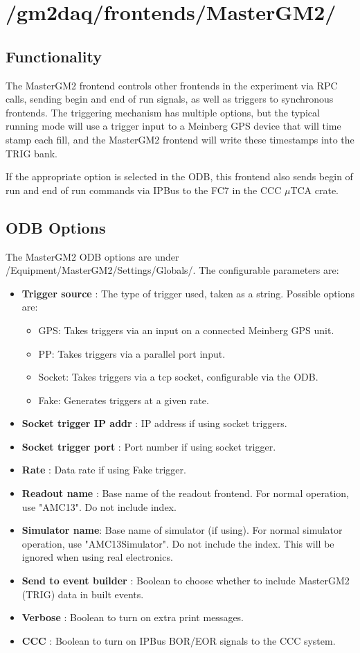 \section{/gm2daq/frontends/MasterGM2/}

\subsection{Functionality}

The MasterGM2 frontend controls other frontends in the experiment via RPC calls, sending begin and end of run signals, as well as triggers to synchronous frontends. The triggering mechanism has multiple options, but the typical running mode will use a trigger input to a Meinberg GPS device that will time stamp each fill, and the MasterGM2 frontend will write these timestamps into the TRIG bank.

If the appropriate option is selected in the ODB, this frontend also sends begin of run and end of run commands via IPBus to the FC7 in the CCC $\mu$TCA crate.

\subsection{ODB Options}

The MasterGM2 ODB options are under /Equipment/MasterGM2/Settings/Globals/. The configurable parameters are:

\begin{itemize}
\item {\bf Trigger source} : The type of trigger used, taken as a string. Possible options are:
\begin{itemize}
\item GPS: Takes triggers via an input on a connected Meinberg GPS unit.
\item PP: Takes triggers via a parallel port input.
\item Socket: Takes triggers via a tcp socket, configurable via the ODB.
\item Fake: Generates triggers at a given rate.
\end{itemize}
\item {\bf Socket trigger IP addr} : IP address if using socket triggers.
\item {\bf Socket trigger port} : Port number if using socket trigger.
\item {\bf Rate} : Data rate if using Fake trigger.
\item {\bf Readout name} : Base name of the readout frontend. For normal operation, use "AMC13". Do not include index.
\item {\bf Simulator name}: Base name of simulator (if using). For normal simulator operation, use "AMC13Simulator". Do not include the index. This will be ignored when using real electronics.
\item {\bf Send to event builder} : Boolean to choose whether to include MasterGM2 (TRIG) data in built events.
\item {\bf Verbose} : Boolean to turn on extra print messages.
\item {\bf CCC} : Boolean to turn on IPBus BOR/EOR signals to the CCC system.
\end{itemize}

